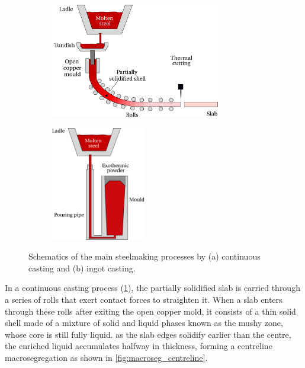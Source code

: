 \begin{figure}[htbp]
\centering
  \begin{subfigure}[t]{0.6\textwidth}
    \centering
	\includegraphics[height=5cm]{Chapter1/Graphics/fig_continuous_casting.pdf}
	\caption{}
    \label{fig:continuous_casting}
  \end{subfigure}
   \begin{subfigure}[t]{0.3\textwidth}
    \centering
	\includegraphics[height=5cm]{Chapter1/Graphics/fig_ingot_casting.pdf}
	\caption{}
    \label{fig:ingot_casting}
  \end{subfigure}
\caption{Schematics of the main steelmaking processes by (a) continuous casting and (b) ingot casting.} 
\label{fig:casting}
\end{figure}
%
%

In a continuous casting process (\cref{fig:continuous_casting}), the partially solidified slab is carried through a series of rolls that exert contact forces to straighten it.
When a slab enters through these rolls after exiting the open copper mold, it consists of a thin solid shell made of a mixture of solid and liquid phases known as the mushy zone, whose core is still fully liquid.
as the slab edges solidify earlier than the centre, the enriched liquid accumulates halfway in thickness, forming a centreline macrosegregation
as shown in \cref{fig:macroseg_centreline}.  

